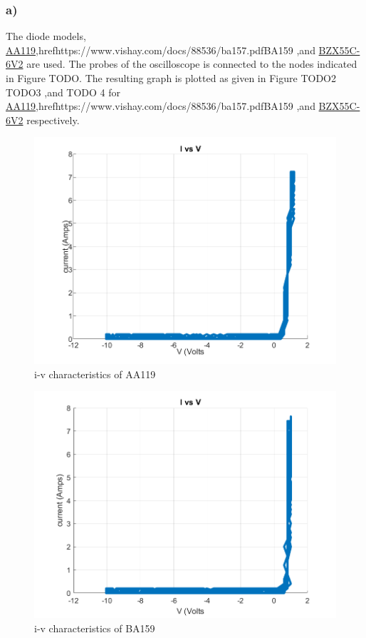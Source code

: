 \documentclass[letterpaper,12pt]{article}
\begin{document}
\subsubsection{a)}
The diode models, \href{https://logosfoundation.org/elektron/mixers/AA119.pdf}{AA119},href{https://www.vishay.com/docs/88536/ba157.pdf}{BA159}  ,and \href{https://www.vishay.com/docs/85604/bzx55.pdf}{BZX55C-6V2} are used. The probes of the oscilloscope is connected to the nodes indicated in Figure TODO. The resulting graph is plotted as given in Figure TODO2 TODO3 ,and TODO 4 for 
\href{https://logosfoundation.org/elektron/mixers/AA119.pdf}{AA119},href{https://www.vishay.com/docs/88536/ba157.pdf}{BA159}  ,and \href{https://www.vishay.com/docs/85604/bzx55.pdf}{BZX55C-6V2} respectively.

\begin{figure}[H]
    \centering
    \includegraphics[width=1\textwidth]{1_aa119.png}
    \caption{i-v characteristics of AA119}
\end{figure} 


\begin{figure}[H]
    \centering
    \includegraphics[width=1\textwidth]{1_ba159.png}
    \caption{i-v characteristics of BA159}
\end{figure} 
\end{document}
